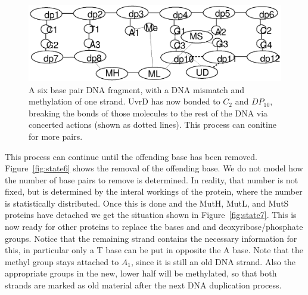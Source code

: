 \begin{figure}[h!]
  \centering
    \includegraphics[width=1.0\textwidth]{mmr/state4}
  \caption[A six base pair DNA fragment.]{A six base pair DNA fragment, with a DNA mismatch and methylation of one strand. UvrD has now bonded to $C_2$ and $DP_{10}$, breaking the bonds of those molecules to the rest of the DNA via concerted actions (shown as dotted lines). This process can conitine for more pairs.}
  \label{fig:state4}
\end{figure}

This process can continue until the offending base has been removed. Figure~\ref{fig:state6} shows the removal of the offending base. We do not model how the number of base pairs to remove is determined. In reality, that number is not fixed, but is determined by the interal workings of the protein, where the number is statistically distributed. Once this is done and the MutH, MutL, and MutS proteins have detached we get the situation shown in Figure~\ref{fig:state7}. This is now ready for other proteins to replace the bases and and deoxyribose/phosphate groups. Notice that the remaining strand contains the necessary information for this, in particular only a T base can be put in opposite the A base. Note that the methyl group stays attached to $A_1$, since it is still an old DNA strand. Also the appropriate groups in the new, lower half will be methylated, so that both strands are marked as old material after the next DNA duplication process.

